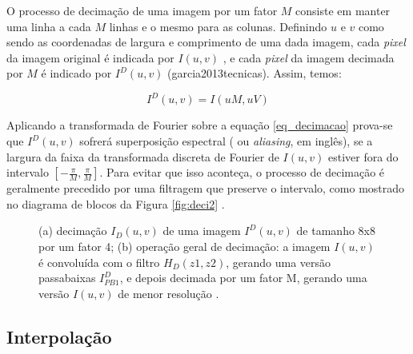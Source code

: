 O processo de decimação de uma imagem por um fator $M$ consiste em manter uma linha a cada $M$ linhas e o mesmo para as colunas. Definindo $u$ e $v$ como sendo as coordenadas de largura e comprimento de uma dada imagem, cada \textit{pixel} da imagem original é indicada por $I(u,v)$ , e cada \textit{pixel} da imagem decimada por $M$ é indicado por $I^D(u,v)$  (garcia2013tecnicas). Assim, temos:

\begin{equation}
I^D(u,v) = I(uM,uV) 
\label{eq_decimacao}
\end{equation}

Aplicando a transformada de Fourier sobre a equação \ref{eq_decimacao} prova-se que $I^D(u,v)$ sofrerá superposição espectral ( ou \textit{aliasing}, em inglês), se a largura da faixa da transformada discreta de Fourier  de $I(u,v)$ estiver fora do intervalo $\left[-\frac{\pi}{M},\frac{\pi}{M} \right]$. Para evitar que isso aconteça, o processo de decimação é geralmente precedido por uma filtragem que preserve o intervalo, como mostrado no diagrama de blocos da Figura \ref{fig:deci2} \cite{garcia2013tecnicas} . \\

\begin{figure}[h]
    \centering
    \qquad
    \caption{(a) decimação $I_D(u,v)$ de uma imagem $I^D(u,v)$ de tamanho 8x8 por um fator 4; (b) operação geral de decimação: a imagem $I(u,v)$ é convoluída com o filtro $H_D(z1,z2)$, gerando uma versão passabaixas $I^D_{PB1}$, e depois decimada por um fator M, gerando uma versão $I(u,v)$ de menor resolução \cite{garcia2013tecnicas}. }%
	    
\end{figure}

\subsection{Interpolação}


